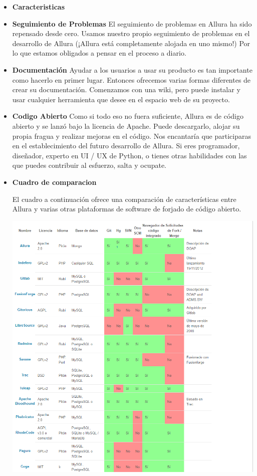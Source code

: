 \begin{itemize}


           \item\textbf {Caracteristicas}
           \item\textbf {Seguimiento de Problemas}
            El seguimiento de problemas en Allura ha sido repensado desde cero. Usamos nuestro propio seguimiento de problemas en el desarrollo de Allura (¡Allura está completamente alojada en uno mismo!) Por lo que estamos obligados a pensar en el proceso a diario.

           \item\textbf {Documentación}
            Ayudar a los usuarios a usar su producto es tan importante como hacerlo en primer lugar. Entonces ofrecemos varias formas diferentes de crear su documentación. Comenzamos con una wiki, pero puede instalar y usar cualquier herramienta que desee en el espacio web de su proyecto.

            \item\textbf {Codigo Abierto}
            Como si todo eso no fuera suficiente, Allura es de código abierto y se lanzó bajo la licencia de Apache. Puede descargarlo, alojar su propia fragua y realizar mejoras en el código. Nos encantaría que participaras en el establecimiento del futuro desarrollo de Allura. Si eres programador, diseñador, experto en UI / UX de Python, o tienes otras habilidades con las que puedes contribuir al esfuerzo, salta y ocupate.
	

           \item\textbf {Cuadro de comparacion}

	El cuadro a continuación ofrece una comparación de características entre Allura y varias otras plataformas de software de forjado de código abierto.

	\begin{center}
	\includegraphics[width=17cm]{./Imagenes/cuadro1} 
	\end{center}

       


\end{itemize} 